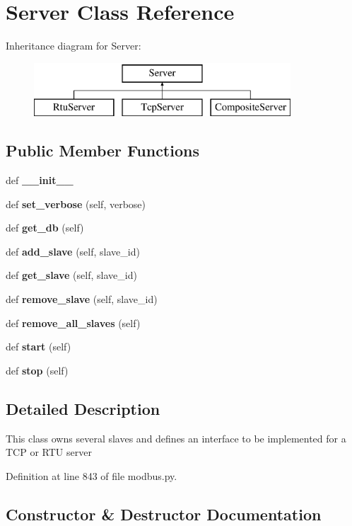 \section{Server Class Reference}
\label{classmodbus__tk_1_1modbus_1_1_server}
Inheritance diagram for Server\+:\begin{figure}[H]
\begin{center}
\leavevmode
\includegraphics[height=2.000000cm]{classmodbus__tk_1_1modbus_1_1_server}
\end{center}
\end{figure}
\subsection*{Public Member Functions}
\begin{DoxyCompactItemize}
\item 
def {\bf \+\_\+\+\_\+init\+\_\+\+\_\+}
\item 
def {\bf set\+\_\+verbose} (self, verbose)
\item 
def {\bf get\+\_\+db} (self)
\item 
def {\bf add\+\_\+slave} (self, slave\+\_\+id)
\item 
def {\bf get\+\_\+slave} (self, slave\+\_\+id)
\item 
def {\bf remove\+\_\+slave} (self, slave\+\_\+id)
\item 
def {\bf remove\+\_\+all\+\_\+slaves} (self)
\item 
def {\bf start} (self)
\item 
def {\bf stop} (self)
\end{DoxyCompactItemize}


\subsection{Detailed Description}
\begin{DoxyVerb}This class owns several slaves and defines an interface
to be implemented for a TCP or RTU server
\end{DoxyVerb}
 

Definition at line 843 of file modbus.\+py.



\subsection{Constructor \& Destructor Documentation}

